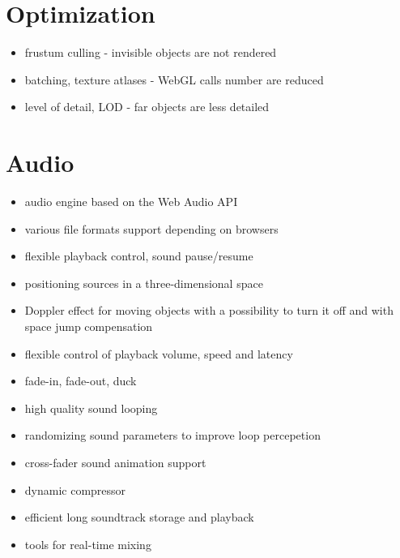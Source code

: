 \documentclass[a4paper,12pt,oneside]{sphinxmanual}
\begin{document}
\section{Optimization}
\label{features:id10}\begin{itemize}
\item {} 
frustum culling - invisible objects are not rendered

\item {} 
batching, texture atlases - WebGL calls number are reduced

\item {} 
level of detail, LOD - far objects are less detailed

\end{itemize}


\section{Audio}
\label{features:id11}\begin{itemize}
\item {} 
audio engine based on the Web Audio API

\item {} 
various file formats support depending on browsers

\item {} 
flexible playback control, sound pause/resume

\item {} 
positioning sources in a three-dimensional space

\item {} 
Doppler effect for moving objects with a possibility to turn it off and with space jump compensation

\item {} 
flexible control of playback volume, speed and latency

\item {} 
fade-in, fade-out, duck

\item {} 
high quality sound looping

\item {} 
randomizing sound parameters to improve loop percepetion

\item {} 
cross-fader sound animation support

\item {} 
dynamic compressor

\item {} 
efficient long soundtrack storage and playback

\item {} 
tools for real-time mixing

\end{itemize}
\end{document}
